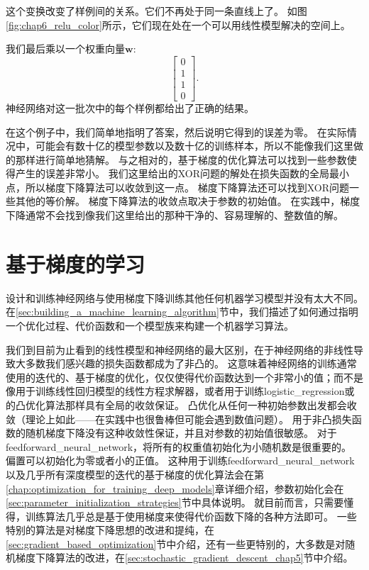 
这个变换改变了样例间的关系。它们不再处于同一条直线上了。
如图\ref{fig:chap6_relu_color}所示，它们现在处在一个可以用线性模型解决的空间上。

我们最后乘以一个权重向量$\bm{w}$:
\begin{equation}
\begin{bmatrix}
0\\
1\\
1\\
0
\end{bmatrix}.
\end{equation}
神经网络对这一批次中的每个样例都给出了正确的结果。

在这个例子中，我们简单地指明了答案，然后说明它得到的误差为零。
在实际情况中，可能会有数十亿的模型参数以及数十亿的训练样本，所以不能像我们这里做的那样进行简单地猜解。
与之相对的，基于梯度的优化算法可以找到一些参数使得产生的误差非常小。
我们这里给出的XOR问题的解处在损失函数的全局最小点，所以梯度下降算法可以收敛到这一点。
梯度下降算法还可以找到XOR问题一些其他的等价解。
梯度下降算法的收敛点取决于参数的初始值。
在实践中，梯度下降通常不会找到像我们这里给出的那种干净的、容易理解的、整数值的解。

\section{基于梯度的学习}
\label{sec:gradient_based_learning}

设计和训练神经网络与使用梯度下降训练其他任何机器学习模型并没有太大不同。
在\ref{sec:building_a_machine_learning_algorithm}节中，我们描述了如何通过指明一个优化过程、代价函数和一个模型族来构建一个机器学习算法。

我们到目前为止看到的线性模型和神经网络的最大区别，在于神经网络的非线性导致大多数我们感兴趣的损失函数都成为了非凸的。
这意味着神经网络的训练通常使用的迭代的、基于梯度的优化，仅仅使得代价函数达到一个非常小的值；而不是像用于训练线性回归模型的线性方程求解器，或者用于训练\gls{logistic_regression}或的凸优化算法那样具有全局的收敛保证。
凸优化从任何一种初始参数出发都会收敛（理论上如此——在实践中也很鲁棒但可能会遇到数值问题）。
用于非凸损失函数的随机梯度下降没有这种收敛性保证，并且对参数的初始值很敏感。
对于\gls{feedforward_neural_network}，将所有的权重值初始化为小随机数是很重要的。
偏置可以初始化为零或者小的正值。
这种用于训练\gls{feedforward_neural_network}以及几乎所有深度模型的迭代的基于梯度的优化算法会在第\ref{chap:optimization_for_training_deep_models}章详细介绍，参数初始化会在\ref{sec:parameter_initialization_strategies}节中具体说明。
就目前而言，只需要懂得，训练算法几乎总是基于使用梯度来使得代价函数下降的各种方法即可。
一些特别的算法是对梯度下降思想的改进和提纯，在\ref{sec:gradient_based_optimization}节中介绍，还有一些更特别的，大多数是对随机梯度下降算法的改进，在\ref{sec:stochastic_gradient_descent_chap5}节中介绍。

